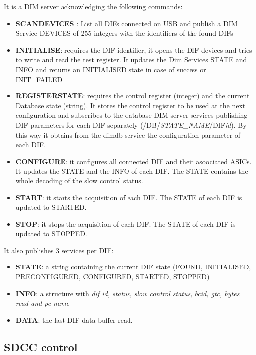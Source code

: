 \documentclass[english]{article}
\begin{document}
It is a DIM server acknowledging the following commands:
\begin{itemize}
\item { \bf SCANDEVICES }: List all DIFs connected on USB and publish a DIM Service DEVICES of 255 integers with the identifiers of the found DIFs
\item {\bf INITIALISE}: requires the DIF identifier, it opens the DIF devices and tries to write and read the test register. It updates the Dim Services STATE and INFO and returns an INITIALISED state in case of success or INIT\_FAILED
\item {\bf REGISTERSTATE}: requires the control register (integer) and the current Database state (string). It stores the control register to be used at the next configuration and subscribes to the database DIM server services publishing DIF parameters for each DIF separately (/DB/{\sl STATE\_NAME}/DIF{\sl id}). By this way it obtains from the dimdb service the configuration parameter of each DIF.

\item {\bf CONFIGURE}: it configures all connected DIF and their asoociated ASICs. It updates the STATE and the INFO of each DIF. The STATE contains the whole decoding of the slow control status. 


\item {\bf START}: it starts the acquisition of each DIF. The STATE of each DIF is updated to STARTED.

\item {\bf STOP}: it stops the acquisition of each DIF. The STATE of each DIF is updated to STOPPED.

\end{itemize}

It also publishes 3 services per DIF:
\begin{itemize}
\item {\bf STATE}: a string containing the current DIF state (FOUND, INITIALISED, PRECONFIGURED, CONFIGURED, STARTED, STOPPED)

\item {\bf INFO}: a structure with {\sl dif id, status, slow control status, bcid, gtc,  bytes read and pc name}

\item {\bf DATA}: the last DIF data buffer read. 
\end{itemize}


\subsection{SDCC control}
\end{document}
